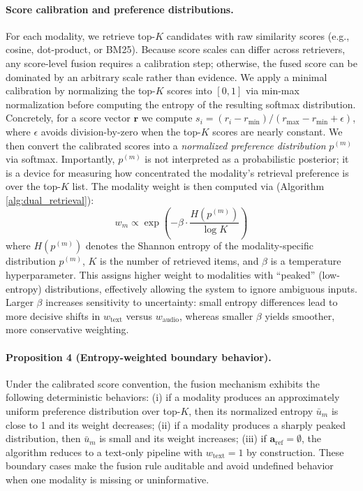 \documentclass{article}
\begin{document}
	\paragraph{Score calibration and preference distributions.}
	For each modality, we retrieve top-$K$ candidates with raw similarity scores (e.g., cosine, dot-product, or BM25). Because score scales can differ across retrievers, any score-level fusion requires a calibration step; otherwise, the fused score can be dominated by an arbitrary scale rather than evidence. We apply a minimal calibration by normalizing the top-$K$ scores into $[0,1]$ via min-max normalization before computing the entropy of the resulting softmax distribution.
	Concretely, for a score vector $\mathbf{r}$ we compute $s_i=(r_i-r_{\min})/(r_{\max}-r_{\min}+\epsilon)$, where $\epsilon$ avoids division-by-zero when the top-$K$ scores are nearly constant. We then convert the calibrated scores into a \textit{normalized preference distribution} $p^{(m)}$ via softmax. Importantly, $p^{(m)}$ is not interpreted as a probabilistic posterior; it is a device for measuring how concentrated the modality's retrieval preference is over the top-$K$ list.
	The modality weight is then computed via (Algorithm \ref{alg:dual_retrieval}):
\begin{equation}
	w_m \propto \exp\left(-\beta \cdot \frac{H(p^{(m)})}{\log K}\right)
\end{equation}
where $H(p^{(m)})$ denotes the Shannon entropy of the modality-specific distribution $p^{(m)}$, $K$ is the number of retrieved items, and $\beta$ is a temperature hyperparameter. This assigns higher weight to modalities with ``peaked'' (low-entropy) distributions, effectively allowing the system to ignore ambiguous inputs.
Larger $\beta$ increases sensitivity to uncertainty: small entropy differences lead to more decisive shifts in $w_{\text{text}}$ versus $w_{\text{audio}}$, whereas smaller $\beta$ yields smoother, more conservative weighting.

\paragraph{Proposition 4 (Entropy-weighted boundary behavior).}
Under the calibrated score convention, the fusion mechanism exhibits the following deterministic behaviors: (i) if a modality produces an approximately uniform preference distribution over top-$K$, then its normalized entropy $\bar{u}_m$ is close to 1 and its weight decreases; (ii) if a modality produces a sharply peaked distribution, then $\bar{u}_m$ is small and its weight increases; (iii) if $\mathbf{a}_{\text{ref}}=\emptyset$, the algorithm reduces to a text-only pipeline with $w_{\text{text}}=1$ by construction. These boundary cases make the fusion rule auditable and avoid undefined behavior when one modality is missing or uninformative.
\end{document}
